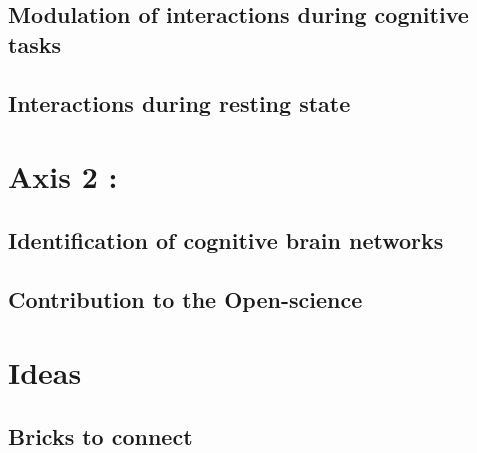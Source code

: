 \documentclass[a4paper,11pt]{article}
\begin{document}
\subsection{Modulation of interactions during cognitive tasks}

\subsection{Interactions during resting state}


\section{Axis 2 : }

\subsection{Identification of cognitive brain networks}

\citep{combrisson2022grouplevel}

\subsection{Contribution to the Open-science}

\citep{combrisson2017sleep,combrisson2019visbrain,combrisson2020tensorpac}










{}












\newpage
\section{Ideas}

\subsection{Bricks to connect}
\end{document}
